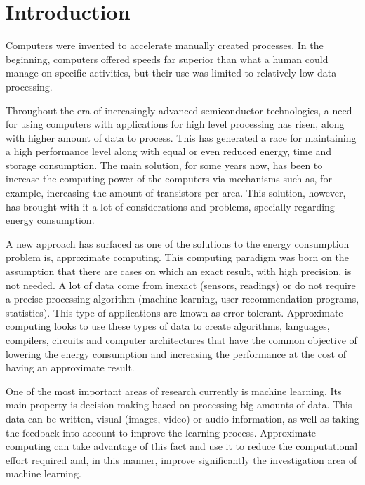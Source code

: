 
\chapter{Introduction}
\label{chp:intro}

Computers were invented to accelerate manually created processes. In the beginning, computers
offered speeds far superior than what a human could manage on specific activities, but their use
was limited to relatively low data processing. 

Throughout the era of increasingly advanced semiconductor technologies, a need for using computers 
with applications for high level processing has risen, along with higher amount of data to process.
This has generated a race for maintaining a high performance level along with equal or even reduced 
energy, time and storage consumption. The main solution, for some years now, has been to increase the 
computing power of the computers via mechanisms such as, for example, increasing the amount of transistors
per area. This solution, however, has brought with it a lot of considerations and problems, specially 
regarding energy consumption.

A new approach has surfaced as one of the solutions to the energy consumption problem is, approximate computing.
This computing paradigm was born on the assumption that there are cases on which an exact result, with high precision,
is not needed. A lot of data come from inexact (sensors, readings) or do not require a precise processing
algorithm (machine learning, user recommendation programs, statistics). This type of applications are
known as error-tolerant. Approximate computing looks to use these types of data to create algorithms,
languages, compilers, circuits and computer architectures that have the common objective of lowering
the energy consumption and increasing the performance at the cost of having an approximate result.

One of the most important areas of research currently is machine learning. Its main property is
decision making based on processing big amounts of data. This data can be written, visual (images, video) or 
audio information, as well as taking the feedback into account to improve the learning process.
Approximate computing can take advantage of this fact and use it to reduce the computational effort
required and, in this manner, improve significantly the investigation area of machine learning.


